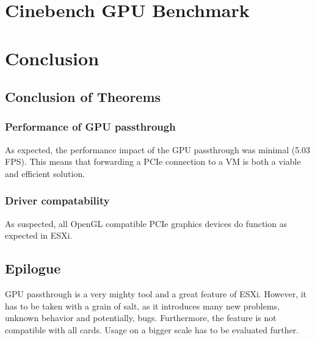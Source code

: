 \documentclass[12pt,a4paper]{report}
\begin{document}
\section{Cinebench GPU Benchmark}


\section{Conclusion}

\subsection{Conclusion of Theorems}

\subsubsection{Performance of GPU passthrough}
As expected, the performance impact of the GPU passthrough was minimal (5.03 FPS). This means that forwarding a PCIe connection to a VM is both a viable and efficient solution.

\subsubsection{Driver compatability}
As suspected, all OpenGL compatible PCIe graphics devices do function as expected in ESXi.

\subsection{Epilogue}

GPU passthrough is a very mighty tool and a great feature of ESXi. However, it has to be taken with a grain of salt, as it introduces many new problems, unknown behavior and potentially, bugs. Furthermore, the feature is not compatible with all cards. Usage on a bigger scale has to be evaluated further.
\end{document}
